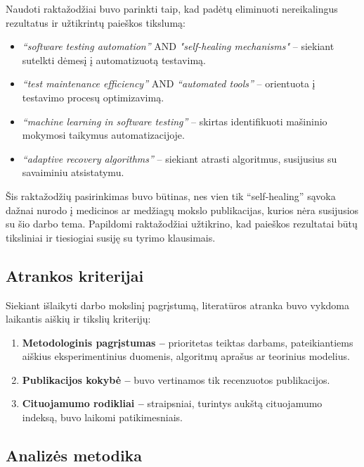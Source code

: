 \documentclass[
]{VUMIFPSkursinis}
\begin{document}
Naudoti raktažodžiai buvo parinkti taip, kad padėtų eliminuoti nereikalingus rezultatus ir užtikrintų paieškos tikslumą:

\begin{itemize}
    \item \textit{“software testing automation”} AND \textit{"self-healing mechanisms"} – siekiant sutelkti dėmesį į automatizuotą testavimą.
    \item \textit{“test maintenance efficiency”} AND \textit{“automated tools”} – orientuota į testavimo procesų optimizavimą.
    \item \textit{“machine learning in software testing”} – skirtas identifikuoti mašininio mokymosi taikymus automatizacijoje.
    \item \textit{“adaptive recovery algorithms”} – siekiant atrasti algoritmus, susijusius su savaiminiu atsistatymu.
\end{itemize}

Šis raktažodžių pasirinkimas buvo būtinas, nes vien tik “self-healing” sąvoka dažnai nurodo į medicinos ar medžiagų mokslo publikacijas, kurios nėra susijusios su šio darbo tema. Papildomi raktažodžiai užtikrino, kad paieškos rezultatai būtų tiksliniai ir tiesiogiai susiję su tyrimo klausimais.

\subsection{Atrankos kriterijai}

Siekiant išlaikyti darbo mokslinį pagrįstumą, literatūros atranka buvo vykdoma laikantis aiškių ir tikslių kriterijų:

\begin{enumerate}
    \item \textbf{Metodologinis pagrįstumas –}  prioritetas teiktas darbams, pateikiantiems aiškius eksperimentinius duomenis, algoritmų aprašus ar teorinius modelius.
    \item \textbf{Publikacijos kokybė –  } buvo vertinamos tik recenzuotos publikacijos.
    \item \textbf{Cituojamumo rodikliai –} straipsniai, turintys aukštą cituojamumo indeksą, buvo laikomi patikimesniais.
\end{enumerate}

\subsection{Analizės metodika}
\end{document}
